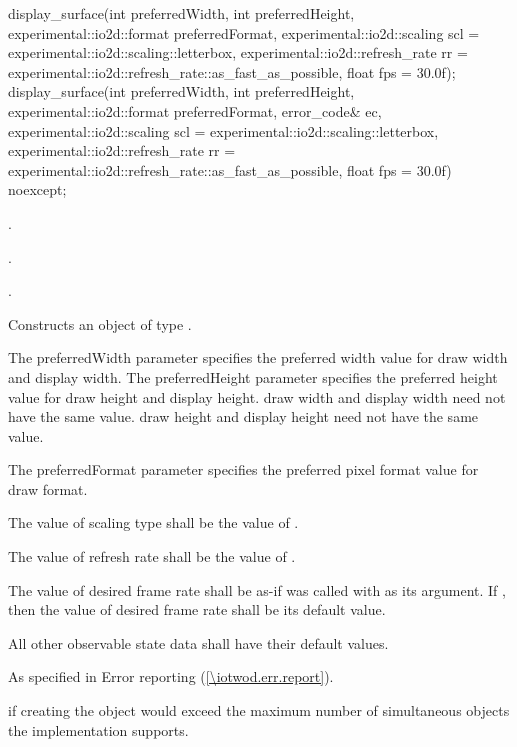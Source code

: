 \begin{itemdecl}
display_surface(int preferredWidth, int preferredHeight, 
  experimental::io2d::format preferredFormat,
  experimental::io2d::scaling scl = experimental::io2d::scaling::letterbox,
  experimental::io2d::refresh_rate rr =
  experimental::io2d::refresh_rate::as_fast_as_possible, float fps = 30.0f);
display_surface(int preferredWidth, int preferredHeight, 
  experimental::io2d::format preferredFormat, error_code& ec,
  experimental::io2d::scaling scl = experimental::io2d::scaling::letterbox,
  experimental::io2d::refresh_rate rr =
  experimental::io2d::refresh_rate::as_fast_as_possible, float fps = 30.0f)
  noexcept;
\end{itemdecl}
\begin{itemdescr}
\pnum
\requires
{}.

\pnum
{}.

\pnum
{}.


\pnum
\effects
Constructs an object of type .

\pnum
The preferredWidth parameter specifies the preferred width value for draw width and display width. The preferredHeight parameter specifies the preferred height value for draw height and display height. draw width and display width need not have the same value. draw height and display height need not have the same value.

\pnum
The preferredFormat parameter specifies the preferred pixel format value for draw format.

\pnum
The value of scaling type shall be the value of .

\pnum
The value of refresh rate shall be the value of .

\pnum
The value of desired frame rate shall be as-if  was called with  as its argument. If , then the value of desired frame rate shall be its default value.

\pnum
All other observable state data shall have their default values.

\pnum
\throws
As specified in Error reporting (\ref{\iotwod.err.report}).

\pnum
\errors
{} if creating the  object would exceed the maximum number of simultaneous  objects the implementation supports.
\end{itemdescr}

